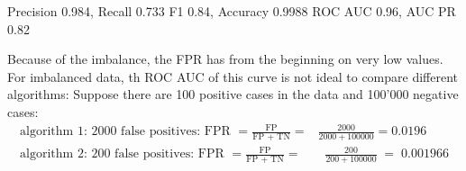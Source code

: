 \documentclass[letterpaper,10pt,english]{jupyterBook}
\begin{document}
\begin{sphinxVerbatim}[commandchars=\\\{\}]
Precision 0.984, Recall 0.733
F1 0.84, Accuracy 0.9988
ROC AUC 0.96, AUC PR 0.82
\end{sphinxVerbatim}

\begin{sphinxVerbatim}[commandchars=\\\{\}]
    
 
\end{sphinxVerbatim}

\noindent{}

\sphinxAtStartPar
Because of the imbalance, the FPR has from the beginning on very low values. For imbalanced data, th ROC AUC of this curve is not ideal to compare different algorithms:
Suppose there are 100 positive cases in the data and 100’000 negative cases:
\label{equation:imbalanced_data:a703f845-1503-47c8-8aa5-20abac9d6af7}\begin{eqnarray}
\text{algorithm 1: 2000 false positives:  FPR } =\frac{\text{FP}}{\text{FP + TN}} = &\frac{2000}{2000 + 100000} = 0.0196\\
\text{algorithm 2:   200  false positives:  FPR } =\frac{\text{FP}}{\text{FP + TN}} = &\;\;\frac{200}{200+ 100000} \;=\; 0.001966
\end{eqnarray}
\begin{sphinxVerbatim}[commandchars=\\\{\}]
\end{sphinxVerbatim}
\end{document}
